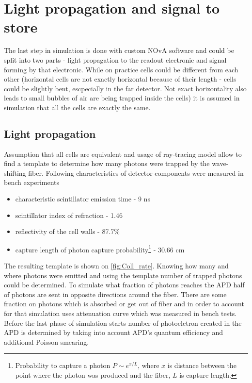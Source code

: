 \section{Light propagation and signal to store}
The last step in simulation is done with custom NOvA software and could be split into two parts - light 
propagation to the readout electronic and signal forming by that electronic. While on practice cells could 
be different from each other (horizontal cells are not exactly horizontal because of their length - cells could be
slightly bent, escpecially in the far detector. Not exact horizontality also leads to small bubbles of air are
being trapped inside the cells) it is assumed in simulation that all the cells are exactly the same.

\subsection{Light propagation}
Assumption that all cells are equivalent and usage of ray-tracing model allow to find a template to determine how 
many photons were trapped by the wave-shifting fiber. Following characteristics of detector components were 
measured in bench experiments 
\begin{itemize}
\item characteristic scintillator emission time - 9 ns
\item scintillator index of refraction - 1.46
\item reflectivity of the cell walls - 87.7\%
\item capture length of photon capture probability\footnote{Probability to capture a photon $P \sim e^{x/L}$, where
$x$ is distance between the point where the photon was produced and the fiber, $L$ is capture length.} - 30.66 cm
\end{itemize}
The resulting template is shown on \ref{fig:Coll_rate}. Knowing how many and where photons were emitted and using
the template number of trapped photons could be determined. To simulate what fraction of photons reaches the APD
half of photons are sent in opposite directions around the fiber. There are some fraction on photons which is 
absorbed or get out of fiber and in order to account for that simulation uses attenuation curve which was 
measured in bench tests. Before the last phase of simulation starts number of photoelctron created in the APD
is determined by taking into account APD's quantum efficiency and additional Poisson smearing.
